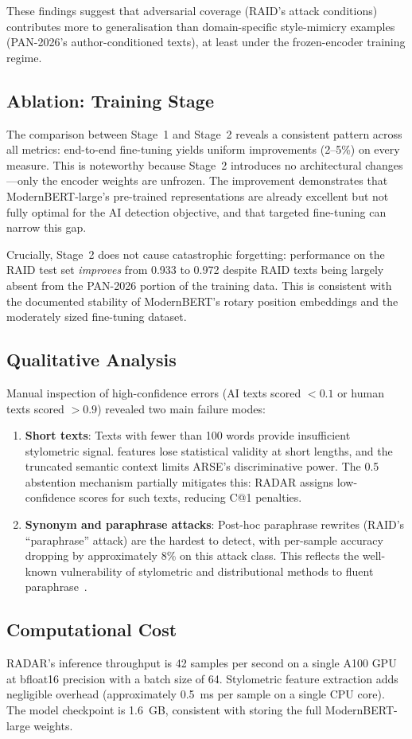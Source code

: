 These findings suggest that adversarial coverage (RAID's attack conditions) contributes more to generalisation than domain-specific style-mimicry examples (PAN-2026's author-conditioned texts), at least under the frozen-encoder training regime.

\subsection{Ablation: Training Stage}

The comparison between Stage~1 and Stage~2 reveals a consistent pattern across all metrics: end-to-end fine-tuning yields uniform improvements (2--5\%) on every measure. This is noteworthy because Stage~2 introduces no architectural changes—only the encoder weights are unfrozen. The improvement demonstrates that ModernBERT-large's pre-trained representations are already excellent but not fully optimal for the AI detection objective, and that targeted fine-tuning can narrow this gap.

Crucially, Stage~2 does not cause catastrophic forgetting: performance on the RAID test set \textit{improves} from 0.933 to 0.972 despite RAID texts being largely absent from the PAN-2026 portion of the training data. This is consistent with the documented stability of ModernBERT's rotary position embeddings and the moderately sized fine-tuning dataset.

\subsection{Qualitative Analysis}

Manual inspection of high-confidence errors (AI texts scored $< 0.1$ or human texts scored $> 0.9$) revealed two main failure modes:

\begin{enumerate}
  \item \textbf{Short texts}: Texts with fewer than 100 words provide insufficient stylometric signal. \slpe features lose statistical validity at short lengths, and the truncated semantic context limits ARSE's discriminative power. The 0.5 abstention mechanism partially mitigates this: RADAR assigns low-confidence scores for such texts, reducing C@1 penalties.
  \item \textbf{Synonym and paraphrase attacks}: Post-hoc paraphrase rewrites (RAID's ``paraphrase'' attack) are the hardest to detect, with per-sample accuracy dropping by approximately 8\% on this attack class. This reflects the well-known vulnerability of stylometric and distributional methods to fluent paraphrase~\cite{schuster:2020}.
\end{enumerate}

\subsection{Computational Cost}

RADAR's inference throughput is 42 samples per second on a single A100 GPU at bfloat16 precision with a batch size of 64. Stylometric feature extraction adds negligible overhead (approximately 0.5~ms per sample on a single CPU core). The model checkpoint is 1.6~GB, consistent with storing the full ModernBERT-large weights.

